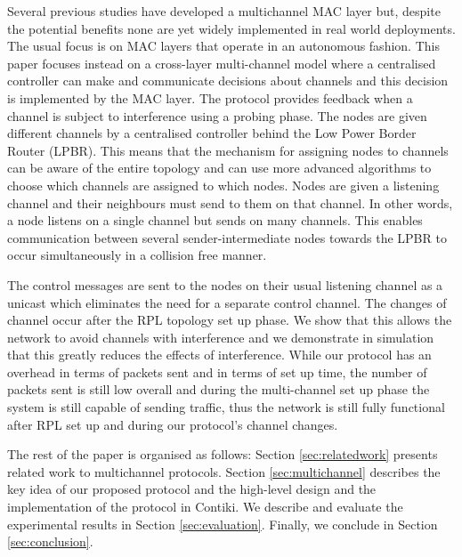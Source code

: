 
Several previous studies have developed a multichannel MAC layer but, despite the potential benefits none are yet widely implemented in real world deployments. The usual focus is on MAC layers that operate in an autonomous fashion. This paper focuses instead on a cross-layer multi-channel model where a centralised controller can make and communicate decisions about channels and this decision is implemented by the MAC layer.  The protocol provides feedback when a channel is subject to interference using a probing phase. The nodes are given different channels by a centralised controller behind the Low Power Border Router (LPBR). This means that the mechanism for assigning nodes to channels can be aware of the entire topology and can use more advanced algorithms to choose which channels are assigned to which nodes. Nodes are given a listening channel and their neighbours must send to them on that channel. In other words, a node listens on a single channel but sends on many channels. This enables communication between several sender-intermediate nodes towards the LPBR to occur simultaneously in a collision free manner.

The control messages are sent to the nodes on their usual listening channel as a unicast which eliminates the need for a separate control channel.
The changes of channel occur after the RPL topology set up phase. We show that this allows the network to avoid channels with interference and we
demonstrate in simulation that this greatly reduces the effects of interference. While our protocol has an overhead in terms of packets sent and in terms of set up time, the number of packets sent is still low overall and during the multi-channel set up phase the system is still capable of
sending traffic, thus the network is still fully functional after RPL set up and during our protocol's channel changes.

The rest of the paper is organised as follows: Section \ref{sec:relatedwork} presents related work to multichannel protocols. Section \ref{sec:multichannel} describes the key idea of our proposed protocol and the high-level design and the implementation of the protocol in Contiki. We describe and evaluate the experimental results in Section \ref{sec:evaluation}. Finally, we conclude in Section \ref{sec:conclusion}.